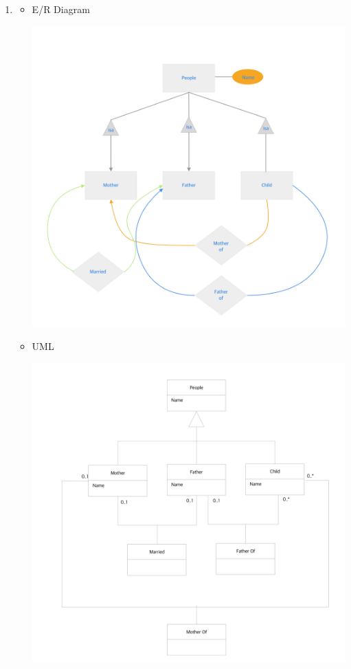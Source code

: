 \documentclass[12pt]{article}
\begin{document}
\begin{enumerate}[1.]
\begin{mdframed}
    \end{mdframed}

    \item

    \begin{itemize}
        \item E/R Diagram

        \begin{center}
        \includegraphics[width=\linewidth]{images/worksheet_15_solution_15.png}
        \end{center}

        \item UML

        \begin{center}
        \includegraphics[width=\linewidth]{images/worksheet_15_solution_16.png}
        \end{center}
    \end{itemize}


\end{enumerate}
\end{document}
